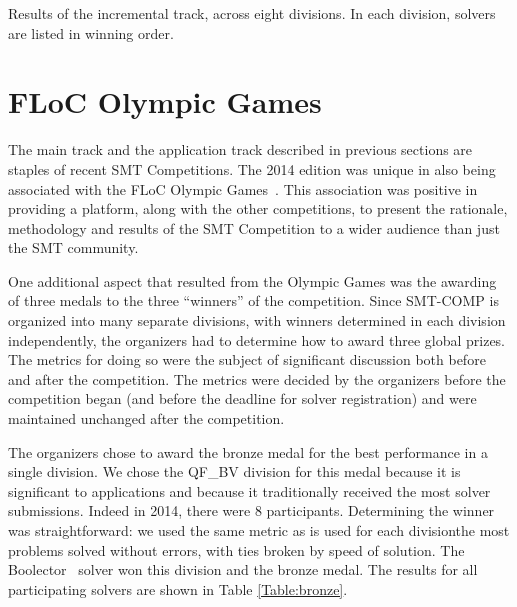 \documentclass[twoside,11pt]{article}
\begin{document}
\begin{table}
\centering

\caption{Results of the incremental track, across eight divisions. In each division, solvers are listed in winning order.}
\label{Fig:apptrack-results}
\end{table}

\section{FLoC Olympic Games}
\label{sec:floc}

The main track and the application track described in previous sections are staples of recent SMT Competitions. The 2014 edition was unique in also being associated with the FLoC Olympic Games~\cite{FLoCGames}.
This association was positive in providing a platform, along with the other competitions, to present the
rationale, methodology and results of the SMT Competition to a wider audience than just the SMT community.

One additional aspect that resulted from the Olympic Games was the awarding of three medals to the three ``winners'' of the competition. Since SMT-COMP is organized into many separate divisions, with winners determined in each division independently, the organizers had to determine how to award three global prizes.
The metrics for doing so were the subject of significant discussion both before and after the competition.
The metrics were decided by the organizers before the competition began (and before the deadline for solver registration) and were maintained unchanged after the competition.

The organizers chose to award the bronze medal for the best performance in a single division. We chose  the QF\_BV division for this medal because it is significant to applications and because it traditionally received the most solver submissions. Indeed in 2014, there were 8 participants. Determining the winner was straightforward: we used the same metric as is used for each division\textemdash the most problems solved without errors, with ties broken by speed of solution. The Boolector~\cite{boolector} solver won this division and the bronze medal. The results for all participating solvers are shown in Table \ref{Table:bronze}.
\end{document}
